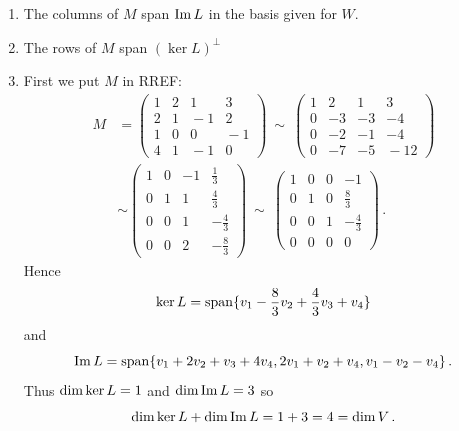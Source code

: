 \begin{enumerate}
\begin{enumerate}
\item The columns of $M$ span $\operatorname{Im} L$ in the basis given for $W$.
\item The rows of $M$ span $(\ker L)^\perp$%
\item First we put $M$ in RREF:
\begin{align*}
M& = \begin{pmatrix}1&2&1&3\\2&1&\!-1&2\\1&0&0&\!-1\\4&1&\!-1&0\end{pmatrix}
\ \sim\
\begin{pmatrix}1&2&1&3\\0&-3&-3&-4\\0&-2&-1&-4\\0&-7&-5&\!-12\end{pmatrix}\\[2mm]
&\sim 
\begin{pmatrix}1&0&-1&\frac13\\[1mm]0&1&1&\frac43\\[1mm]0&0&1&-\frac43\\[1mm]0&0&2&-\frac83\end{pmatrix}
\ \sim\ \begin{pmatrix}1&0&0&-1\\[1mm]0&1&0&\frac83\\[1mm]0&0&1&-\frac43\\[1mm]0&0&0&0\end{pmatrix}\, .
\end{align*}
Hence \[\ker L=\operatorname{span}\{v_1-\frac83v_2+\frac43 v_3+v_4\}\] and \[\operatorname{Im} L=\operatorname{span}\{v_1+2v_2+v_3+4v_4,2v_1+v_2+v_4,v_1-v_2-v_4\}\, .\]
Thus $\operatorname{dim}\ker L=1$ and $\operatorname{dim}\operatorname{Im} L=3$ so \[\operatorname{dim}\ker L+\operatorname{dim}\operatorname{Im} L=1+3=4=\operatorname{dim} V\, .\]
\end{enumerate}


\end{enumerate}
